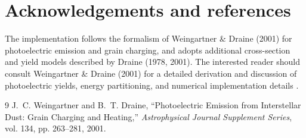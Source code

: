 \documentclass{article}
\begin{document}
\section*{Acknowledgements and references}
The implementation follows the formalism of Weingartner & Draine (2001) for
photoelectric emission and grain charging, and adopts additional cross-section
and yield models described by Draine (1978, 2001). The interested reader
should consult Weingartner & Draine (2001) for a detailed derivation and
discussion of photoelectric yields, energy partitioning, and numerical
implementation details \cite{Weingartner2001}.

\begin{thebibliography}{9}
J.~C. Weingartner and B.~T. Draine,
``Photoelectric Emission from Interstellar Dust: Grain Charging and Heating,''
\emph{Astrophysical Journal Supplement Series}, vol. 134, pp. 263--281, 2001.
\end{thebibliography}
\end{document}
